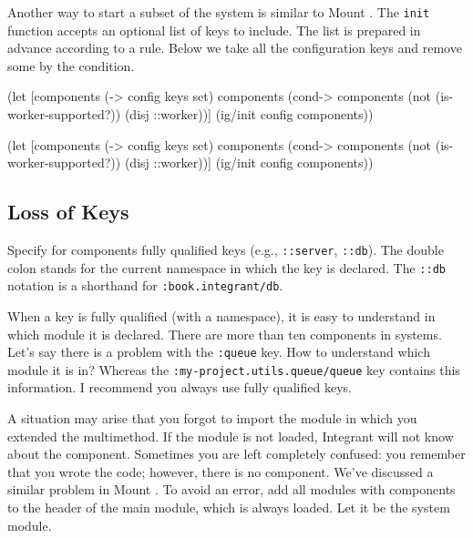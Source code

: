 Another way to start a subset of the system is similar to Mount . The \verb|init| function accepts an optional list of keys to include. The list is prepared in advance according to a rule. Below we take all the configuration keys and remove some by the condition.

\ifnarrow

\begin{english}
  \begin{clojure}
(let [components (-> config keys set)
      components
      (cond-> components
        (not (is-worker-supported?))
        (disj ::worker))]
  (ig/init config components))
  \end{clojure}
\end{english}

\else

\begin{english}
  \begin{clojure}
(let [components (-> config keys set)
      components (cond-> components
                   (not (is-worker-supported?))
                   (disj ::worker))]
  (ig/init config components))
  \end{clojure}
\end{english}

\fi

\subsection{Loss of Keys}


Specify for components fully qualified keys (e.g., \verb|::server|, \verb|::db|). The double colon stands for the current namespace in which the key is declared. The \verb|::db| notation is a shorthand for \verb|:book.integrant/db|.

When a key is fully qualified (with a namespace), it is easy to understand in which module it is declared. There are more than ten components in systems. Let's say there is a problem with the \verb|:queue| key. How to understand which module it is in? Whereas the \texttt{:my-project.utils.queue\-/queue} key contains this information. I recommend you always use fully qualified keys.

A situation may arise that you forgot to import the module in which you extended the multimethod. If the module is not loaded, Integrant will not know about the component. Sometimes you are left completely confused: you remember that you wrote the code; however, there is no component. We've discussed a similar problem in Mount . To avoid an error, add all modules with components to the header of the main module, which is always loaded. Let it be the system module.

